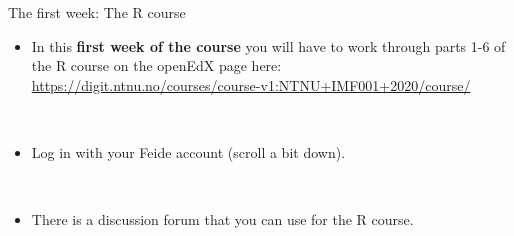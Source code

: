 \documentclass[
  10pt,
  ignorenonframetext,
]{beamer}
\providecommand{\tightlist}{%
  \setlength{\itemsep}{0pt}\setlength{\parskip}{0pt}}
\begin{document}
\begin{frame}
\begin{block}{The first week: The R course}
\protect\hypertarget{the-first-week-the-r-course}{}
\(~\)

\begin{itemize}
\tightlist
\item
  In this \textbf{first week of the course} you will have to work
  through parts 1-6 of the R course on the openEdX page here:
  \url{https://digit.ntnu.no/courses/course-v1:NTNU+IMF001+2020/course/}
\end{itemize}

\(~\)

\begin{itemize}
\tightlist
\item
  Log in with your Feide account (scroll a bit down).
\end{itemize}

\(~\)

\begin{itemize}
\tightlist
\item
  There is a discussion forum that you can use for the R course.
\end{itemize}
\end{block}
\end{frame}
\end{document}
